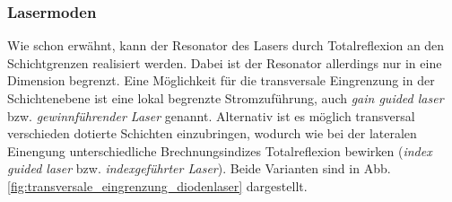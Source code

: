 \subsubsection{Lasermoden}\label{subsubsec:lasermoden}
Wie schon erwähnt, kann der Resonator des Lasers durch Totalreflexion an den
Schichtgrenzen realisiert werden. Dabei ist der Resonator allerdings nur in eine
Dimension begrenzt. Eine Möglichkeit für die transversale Eingrenzung in
der Schichtenebene ist eine lokal begrenzte Stromzuführung, auch \textit{gain
guided laser} bzw. \textit{gewinnführender Laser} genannt. Alternativ ist es
möglich transversal verschieden dotierte Schichten einzubringen, wodurch wie bei
der lateralen Einengung unterschiedliche Brechnungsindizes Totalreflexion
bewirken (\textit{index guided laser} bzw. \textit{indexgeführter Laser}). Beide
Varianten sind in Abb. \ref{fig:transversale_eingrenzung_diodenlaser}
dargestellt.
